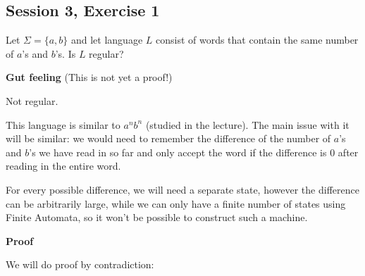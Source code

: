 \subsection{Session 3, Exercise 1}
\label{3.1}


Let $\Sigma = \{a,b\}$ and let language $L$ consist of words
that contain the same number of $a$'s and $b$'s. Is $L$ regular?


\textbf{Gut feeling} (This is not yet a proof!)

Not regular.

This language is similar to $a^nb^n$ (studied in the lecture). The
main issue with it will be similar: we would need to remember the difference
of the number of $a$'s and $b$'s we have read in so far and only
accept the word if the difference is $0$ after reading in the entire
word.

For every possible difference, we will need a separate state, however the
difference can be arbitrarily large, while we can only have a finite
number of states using Finite Automata, so it won't be possible
to construct such a machine.

\textbf{Proof}

We will do proof by contradiction:

